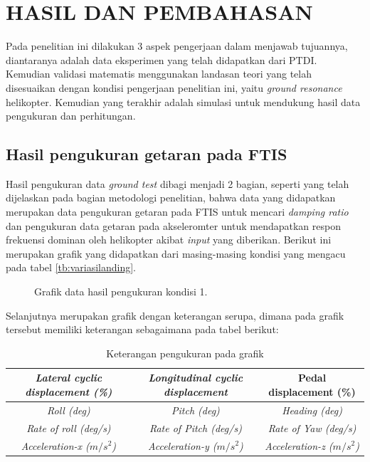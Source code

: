 \chapter{HASIL DAN PEMBAHASAN}
\label{chap:hasil dan pembahasan}


Pada penelitian ini dilakukan 3 aspek pengerjaan dalam menjawab tujuannya, diantaranya adalah data eksperimen yang telah didapatkan dari PTDI. Kemudian validasi matematis menggunakan landasan teori yang telah disesuaikan dengan kondisi pengerjaan penelitian ini, yaitu \textit{ground resonance} helikopter. Kemudian yang terakhir adalah simulasi untuk mendukung hasil data pengukuran dan perhitungan. 

\section{Hasil pengukuran getaran pada FTIS}

Hasil pengukuran data \textit{ground test} dibagi menjadi 2 bagian, seperti yang telah dijelaskan pada bagian metodologi penelitian, bahwa data yang didapatkan merupakan data pengukuran getaran pada FTIS untuk mencari \textit{damping ratio} dan pengukuran data getaran pada akseleromter untuk mendapatkan respon frekuensi dominan oleh helikopter akibat \textit{input} yang diberikan. Berikut ini merupakan grafik yang didapatkan dari masing-masing kondisi yang mengacu pada tabel \ref{tb:variasilanding}.

\begin{figure}[H]
	\centering
	\caption{Grafik data hasil pengukuran kondisi 1.}
	\label{fig:condition_1}
\end{figure}

Selanjutnya merupakan grafik dengan keterangan serupa, dimana pada grafik tersebut memiliki keterangan sebagaimana pada tabel berikut:

\begin{table}[]
	\caption{Keterangan pengukuran pada grafik}
	\begin{tabular}{|c|c|c|}
		\hline
		\textit{Lateral cyclic displacement (\%)} & \textit{Longitudinal cyclic displacement} & Pedal displacement (\%)           \\ \hline
		\textit{Roll (deg)}                       & \textit{Pitch (deg)}                      & \textit{Heading (deg)}            \\ \hline
		\textit{Rate of roll (deg/s)}             & \textit{Rate of Pitch (deg/s)}            & \textit{Rate of Yaw (deg/s)}      \\ \hline
		\textit{Acceleration-x ($m/s^2$)}         & \textit{Acceleration-y ($m/s^2$)}         & \textit{Acceleration-z ($m/s^2$)} \\ \hline
	\end{tabular}
\end{table}

